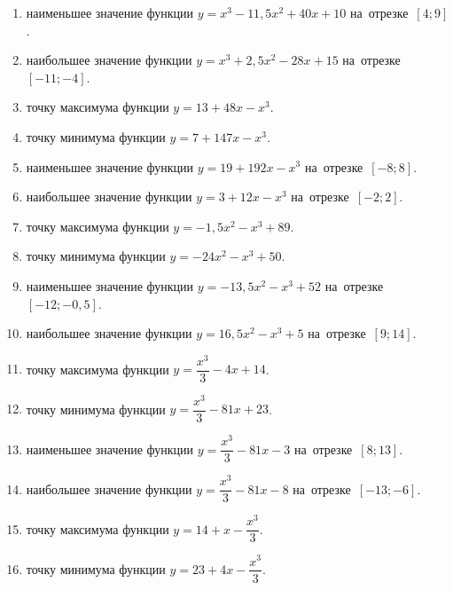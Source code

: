 \documentclass[a4paper,10pt]{article}
\begin{document}
\begin{enumerate}
\item {} наименьшее значение функции $y=x^3 -11,5x^2+40x+10$ на~отрезке~$\left[4;9\right]$.

\item {} наибольшее значение функции $y=x^3 +2,5x^2-28x+15$ на~отрезке~$\left[-11;-4\right]$.

\item {} точку максимума функции $y=13+48x-x^3$.

\item {} точку минимума функции $y=7+147x-x^3$.

\item {} наименьшее значение функции $y=19+192x-x^3$ на~отрезке~$\left[-8;8\right]$.

\item {} наибольшее значение функции $y=3+12x-x^3$ на~отрезке~$\left[-2;2\right]$.

\item {} точку максимума функции $y=-1,5x^2-x^3+89$.

\item {} точку минимума функции $y=-24x^2-x^3+50$.

\item {} наименьшее значение функции $y=-13,5x^2-x^3+52$ на~отрезке~$\left[-12;-0,5\right]$.

\item {} наибольшее значение функции $y=16,5x^2-x^3+5$ на~отрезке~$\left[9;14\right]$.

\item {} точку максимума функции $y=\dfrac{x^3}{3} -4x+14$.

\item {} точку минимума функции $y=\dfrac{x^3}{3} -81x+23$.

\item {} наименьшее значение функции $y=\dfrac{x^3}{3} -81x-3$ на~отрезке~$\left[8;13\right]$.

\item {} наибольшее значение функции $y=\dfrac{x^3}{3} -81x-8$ на~отрезке~$\left[-13;-6\right]$.

\item {} точку максимума функции $y=14 +x-\dfrac{x^3}{3}$.

\item {} точку минимума функции $y=23 +4x-\dfrac{x^3}{3}$.


\end{enumerate}
\end{document}
